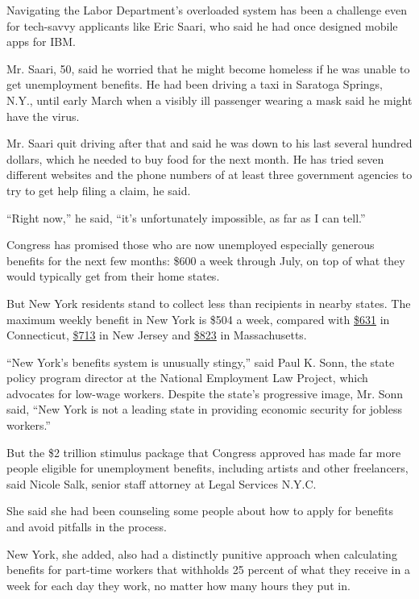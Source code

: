 Navigating the Labor Department's overloaded system has been a challenge
even for tech-savvy applicants like Eric Saari, who said he had once
designed mobile apps for IBM.

Mr. Saari, 50, said he worried that he might become homeless if he was
unable to get unemployment benefits. He had been driving a taxi in
Saratoga Springs, N.Y., until early March when a visibly ill passenger
wearing a mask said he might have the virus.

Mr. Saari quit driving after that and said he was down to his last
several hundred dollars, which he needed to buy food for the next month.
He has tried seven different websites and the phone numbers of at least
three government agencies to try to get help filing a claim, he said.

``Right now,'' he said, ``it's unfortunately impossible, as far as I can
tell.''

Congress has promised those who are now unemployed especially generous
benefits for the next few months: \$600 a week through July, on top of
what they would typically get from their home states.

But New York residents stand to collect less than recipients in nearby
states. The maximum weekly benefit in New York is \$504 a week, compared
with
\href{https://www.cbia.com/news/issues-policies/ct-raises-unemployment-benefit/}{\$631}
in Connecticut,
\href{https://www.nj.gov/labor/lwdhome/press/2019/20200113_benefitrates.shtml}{\$713}
in New Jersey and
\href{https://www.mass.gov/info-details/how-your-unemployment-benefits-are-determined\#calculating-your-maximum-benefit-credit-}{\$823}
in Massachusetts.

``New York's benefits system is unusually stingy,'' said Paul K. Sonn,
the state policy program director at the National Employment Law
Project, which advocates for low-wage workers. Despite the state's
progressive image, Mr. Sonn said, ``New York is not a leading state in
providing economic security for jobless workers.''

But the \$2 trillion stimulus package that Congress approved has made
far more people eligible for unemployment benefits, including artists
and other freelancers, said Nicole Salk, senior staff attorney at Legal
Services N.Y.C.

She said she had been counseling some people about how to apply for
benefits and avoid pitfalls in the process.

New York, she added, also had a distinctly punitive approach when
calculating benefits for part-time workers that withholds 25 percent of
what they receive in a week for each day they work, no matter how many
hours they put in.

